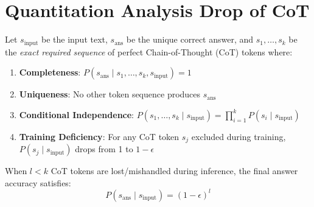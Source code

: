 \section{Quantitation Analysis Drop of CoT}
    \begin{theorem}
    Let $s_{\text{input}}$ be the input text, $s_{\text{ans}}$ be the unique correct answer, and $s_1, \dots, s_k$ be the \textit{exact required sequence} of perfect Chain-of-Thought (CoT) tokens where:
    \begin{enumerate}
        \item \textbf{Completeness}: $P(s_{\text{ans}} \mid s_1, \dots, s_k, s_{\text{input}}) = 1$
        \item \textbf{Uniqueness}: No other token sequence produces $s_{\text{ans}}$
        \item \textbf{Conditional Independence}: $P(s_1, \dots, s_k \mid s_{\text{input}}) = \prod_{i=1}^k P(s_i \mid s_{\text{input}})$
        \item \textbf{Training Deficiency}: For any CoT token $s_j$ excluded during training, $P(s_j \mid s_{\text{input}})$ drops from 1 to $1 - \epsilon$
    \end{enumerate}
    When $l < k$ CoT tokens are lost/mishandled during inference, the final answer accuracy satisfies:
    \[
    P(s_{\text{ans}} \mid s_{\text{input}}) = (1 - \epsilon)^l
    \]
    \label{thm:drop_CoT}
\end{theorem}


